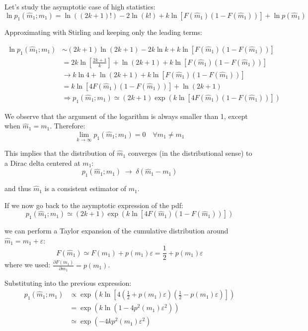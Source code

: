 Let's study the asymptotic case of high statistics:
	\[
	\ln p_1\left(\hat{m}_1;m_1\right) = \ln\left(\left(2k+1\right)!\right) -2\ln (k!) +k\ln\left[F\left(\hat{m}_1\right)\left(1-F\left(\hat{m}_1\right)\right)\right] + \ln p\left(\hat{m}_1\right)
	\]

Approximating with Stirling and keeping only the leading terms:

\begin{align*}
	\ln p_1\left(\hat{m}_1;m_1\right) &\sim \left(2k+1\right)\ln\left(2k+1\right) - 2k\ln k + k\ln\left[F\left(\hat{m}_1\right)\left(1-F\left(\hat{m}_1\right)\right)\right] \\
	&= 2k\ln\left[\frac{2k+1}{k}\right]+\ln\left(2k+1\right) + k\ln\left[F\left(\hat{m}_1\right)\left(1-F\left(\hat{m}_1\right)\right)\right] \\
	&\rightarrow k\ln 4 + \ln\left(2k+1\right) + k\ln\left[F\left(\hat{m}_1\right)\left(1-F\left(\hat{m}_1\right)\right)\right] \\
	&= k\ln\left[4F\left(\hat{m}_1\right)\left(1-F\left(\hat{m}_1\right)\right)\right] + \ln\left(2k+1\right) \\
	&\Rightarrow p_1\left(\hat{m}_1;m_1\right) \simeq \left(2k+1\right)\exp\left(k\ln\left[4F\left(\hat{m}_1\right)\left(1-F\left(\hat{m}_1\right)\right)\right]\right)
\end{align*}

We observe that the argument of the logarithm is always smaller than 1, except when $\hat{m}_1 = m_1$. Therefore:
\[
\lim_{k \to \infty} p_1(\hat{m}_1; m_1) = 0 \quad \forall \hat{m}_1 \neq m_1
\]

This implies that the distribution of $\hat{m}_1$ converges (in the distributional sense) to a Dirac delta centered at $m_1$:
\[
p_1(\hat{m}_1; m_1) \;\longrightarrow\; \delta(\hat{m}_1 - m_1)
\]

and thus $\hat{m}_1$ is a consistent estimator of $m_1$.

If we now go back to the asymptotic expression of the pdf:
\[
p_1(\hat{m}_1; m_1) \simeq (2k+1)\exp\left(k \ln\left[4F(\hat{m}_1)\left(1 - F(\hat{m}_1)\right)\right]\right)
\]

we can perform a Taylor expansion of the cumulative distribution around $\hat{m}_1 = m_1 + \varepsilon$:
\[
F(\hat{m}_1) \simeq F(m_1) + p(m_1)\varepsilon = \frac{1}{2} + p(m_1)\varepsilon
\]
where we used: $\frac{\partial F(m_1)}{\partial m_1}=p(m_1)$.

Substituting into the previous expression:
\begin{align*}
	p_1(\hat{m}_1; m_1)
	&\propto \exp\left(k \ln\left[4\left(\frac{1}{2} + p(m_1)\varepsilon\right)\left(\frac{1}{2} - p(m_1)\varepsilon\right)\right]\right) \\
	&= \exp\left(k \ln\left(1 - 4p^2(m_1)\varepsilon^2\right)\right) \\
	&\simeq \exp\left(-4k p^2(m_1)\varepsilon^2\right)
\end{align*}

